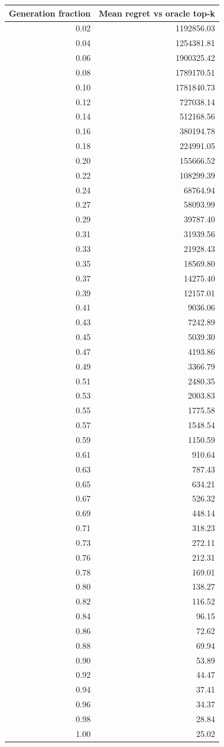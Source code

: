\begin{tabular}{rr}
\toprule
Generation fraction & Mean regret vs oracle top-k \\
\midrule
0.02 & 1192856.03 \\
0.04 & 1254381.81 \\
0.06 & 1900325.42 \\
0.08 & 1789170.51 \\
0.10 & 1781840.73 \\
0.12 & 727038.14 \\
0.14 & 512168.56 \\
0.16 & 380194.78 \\
0.18 & 224991.05 \\
0.20 & 155666.52 \\
0.22 & 108299.39 \\
0.24 & 68764.94 \\
0.27 & 58093.99 \\
0.29 & 39787.40 \\
0.31 & 31939.56 \\
0.33 & 21928.43 \\
0.35 & 18569.80 \\
0.37 & 14275.40 \\
0.39 & 12157.01 \\
0.41 & 9036.06 \\
0.43 & 7242.89 \\
0.45 & 5039.30 \\
0.47 & 4193.86 \\
0.49 & 3366.79 \\
0.51 & 2480.35 \\
0.53 & 2003.83 \\
0.55 & 1775.58 \\
0.57 & 1548.54 \\
0.59 & 1150.59 \\
0.61 & 910.64 \\
0.63 & 787.43 \\
0.65 & 634.21 \\
0.67 & 526.32 \\
0.69 & 448.14 \\
0.71 & 318.23 \\
0.73 & 272.11 \\
0.76 & 212.31 \\
0.78 & 169.01 \\
0.80 & 138.27 \\
0.82 & 116.52 \\
0.84 & 96.15 \\
0.86 & 72.62 \\
0.88 & 69.94 \\
0.90 & 53.89 \\
0.92 & 44.47 \\
0.94 & 37.41 \\
0.96 & 34.37 \\
0.98 & 28.84 \\
1.00 & 25.02 \\
\bottomrule
\end{tabular}
